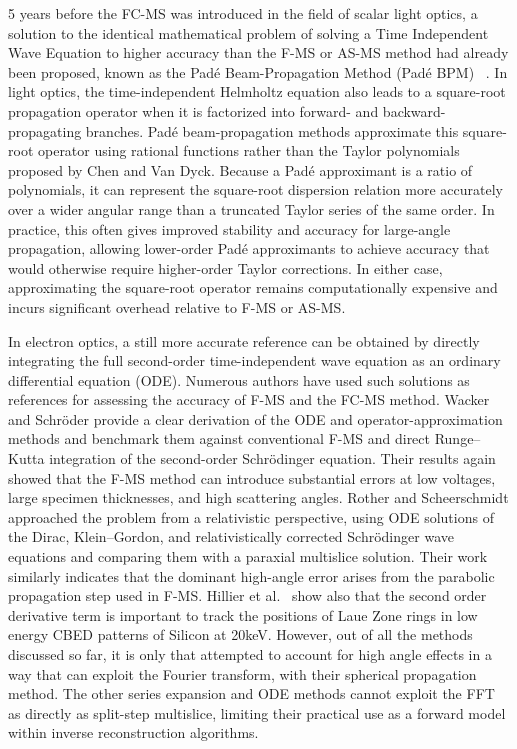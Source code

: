 \documentclass[preprint,12pt,number]{elsarticle}
\begin{document}
5 years before the FC-MS was introduced in the field of scalar light 
optics, a solution to the identical mathematical problem of solving a Time Independent Wave Equation
to higher accuracy than the F-MS or AS-MS method had already been proposed, known as 
the Pad\'e Beam-Propagation Method (Pad\'e BPM)
~\cite{Hadley1992}. In light optics, the time-independent Helmholtz equation also
leads to a square-root propagation operator when it is factorized into forward-
and backward-propagating branches. Pad\'e beam-propagation methods approximate
this square-root operator using rational functions rather than the Taylor
polynomials proposed by Chen and Van Dyck. Because a Pad\'e approximant is a ratio
of polynomials, it can represent the square-root dispersion relation more
accurately over a wider angular range than a truncated Taylor series of the
same order. In practice, this often gives improved stability and accuracy for
large-angle propagation, allowing lower-order Pad\'e approximants to achieve
accuracy that would otherwise require higher-order Taylor corrections. In
either case, approximating the square-root operator remains computationally
expensive and incurs significant overhead relative to F-MS or AS-MS.

In electron optics, a still more accurate reference can be obtained by directly
integrating the full second-order time-independent wave equation as an ordinary
differential equation (ODE). Numerous authors have used such solutions as
references for assessing the accuracy of F-MS and the FC-MS method.
Wacker and Schr\"oder provide a clear derivation of the ODE and
operator-approximation methods and benchmark them against conventional F-MS and
direct Runge--Kutta integration of the second-order Schr\"odinger equation.
Their results again showed that the F-MS method can introduce
substantial errors at low voltages, large specimen thicknesses, and high
scattering angles. Rother and Scheerschmidt approached the problem from a
relativistic perspective, using ODE solutions of the Dirac, Klein--Gordon, and
relativistically corrected Schr\"odinger wave equations and comparing them with
a paraxial multislice solution. Their work similarly indicates that the
dominant high-angle error arises from the parabolic propagation step used in
F-MS. Hillier et al.~\cite{hillier_role_2017} show also that the second order 
derivative term is important to track the positions of Laue Zone rings in low energy CBED patterns 
of Silicon at 20keV. However, out of all the methods discussed so far, it is only \cite{ming2013pcms} 
that attempted to account for high angle effects in a way that can exploit the Fourier transform, with their spherical
propagation method. The other series expansion and ODE methods cannot exploit the FFT as directly as
split-step multislice, limiting their practical use as a forward model within
inverse reconstruction algorithms.
\end{document}
